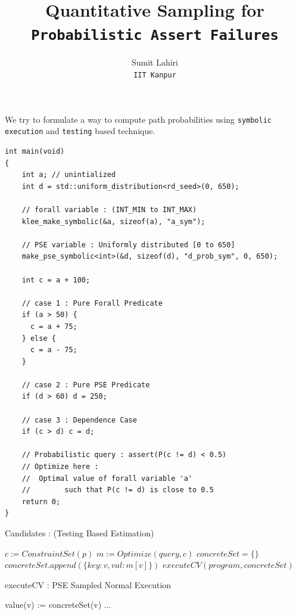 \documentclass{article}
\title{Quantitative Sampling for \\ \texttt{Probabilistic Assert Failures}}
\author{Sumit Lahiri \\ \texttt{IIT Kanpur}}
\begin{document}
\maketitle

We try to formulate a way to compute path probabilities using \texttt{symbolic execution} and \texttt{testing} based technique. 

\begin{verbatim} 
int main(void)
{
	int a; // unintialized
	int d = std::uniform_distribution<rd_seed>(0, 650);
	
	// forall variable : (INT_MIN to INT_MAX)
	klee_make_symbolic(&a, sizeof(a), "a_sym");
	
	// PSE variable : Uniformly distributed [0 to 650]
	make_pse_symbolic<int>(&d, sizeof(d), "d_prob_sym", 0, 650);
	
	int c = a + 100;
	
	// case 1 : Pure Forall Predicate
	if (a > 50) {
	  c = a + 75;
	} else {
	  c = a - 75;
	}
	
	// case 2 : Pure PSE Predicate
	if (d > 60) d = 250;
	
	// case 3 : Dependence Case
	if (c > d) c = d;

	// Probabilistic query : assert(P(c != d) < 0.5)
	// Optimize here : 
	//	Optimal value of forall variable 'a' 
	//        such that P(c != d) is close to 0.5 	
	return 0;
}
\end{verbatim}

\begin{algorithm}[H]
	\caption{Candidates : (Testing Based Estimation)}
	\begin{algorithmic}[1]
		\State $c := ConstraintSet(p)$ 
		\State $m := Optimize(query,  c)$ 
		\State $concreteSet = \{ \}$
		\State $concreteSet.append(\{key : v, val : m[v]\})$ 
		\EndForEach
		\State $executeCV(program, concreteSet)$
		\EndForEach
	\end{algorithmic}
\end{algorithm}

\begin{algorithm}[H]
	\caption{executeCV : PSE Sampled Normal Execution}
	\begin{algorithmic}[1]
		\State value(v) := concreteSet(v) 
		\EndForEach
		\State ... 
		\EndFunction
	\end{algorithmic}
\end{algorithm}
\end{document}
